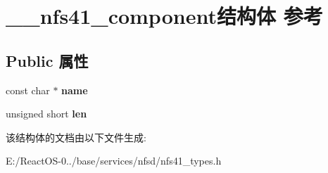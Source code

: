 \hypertarget{struct____nfs41__component}{}\section{\+\_\+\+\_\+nfs41\+\_\+component结构体 参考}
\label{struct____nfs41__component}
\subsection*{Public 属性}
\begin{DoxyCompactItemize}
\item 
\mbox{\label{struct____nfs41__component_a00866b24c9e6540140a97d93e518c1ea}} 
const char $\ast$ {\bfseries name}
\item 
\mbox{\label{struct____nfs41__component_a57e655ec4eba841eaf8fce599a824f3b}} 
unsigned short {\bfseries len}
\end{DoxyCompactItemize}


该结构体的文档由以下文件生成\+:\begin{DoxyCompactItemize}
\item 
E\+:/\+React\+O\+S-\/0../base/services/nfsd/nfs41\+\_\+types.\+h\end{DoxyCompactItemize}
